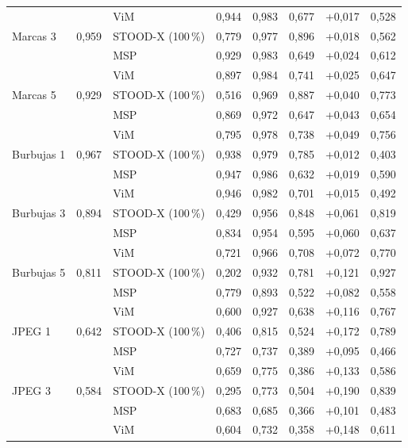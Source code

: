{\begin{longtable}{lllccccc}
 &  & ViM & 0{,}944 & 0{,}983 & 0{,}677 & +0{,}017 & 0{,}528 \\
\addlinespace[2pt]
Marcas 3 & 0{,}959 & STOOD-X (100\,\%) & 0{,}779 & 0{,}977 & 0{,}896 & +0{,}018 & 0{,}562 \\
 &  & MSP & 0{,}929 & 0{,}983 & 0{,}649 & +0{,}024 & 0{,}612 \\
 &  & ViM & 0{,}897 & 0{,}984 & 0{,}741 & +0{,}025 & 0{,}647 \\
\addlinespace[2pt]
Marcas 5 & 0{,}929 & STOOD-X (100\,\%) & 0{,}516 & 0{,}969 & 0{,}887 & +0{,}040 & 0{,}773 \\
 &  & MSP & 0{,}869 & 0{,}972 & 0{,}647 & +0{,}043 & 0{,}654 \\
 &  & ViM & 0{,}795 & 0{,}978 & 0{,}738 & +0{,}049 & 0{,}756 \\
\addlinespace[2pt]
Burbujas 1 & 0{,}967 & STOOD-X (100\,\%) & 0{,}938 & 0{,}979 & 0{,}785 & +0{,}012 & 0{,}403 \\
 &  & MSP & 0{,}947 & 0{,}986 & 0{,}632 & +0{,}019 & 0{,}590 \\
 &  & ViM & 0{,}946 & 0{,}982 & 0{,}701 & +0{,}015 & 0{,}492 \\
\addlinespace[2pt]
Burbujas 3 & 0{,}894 & STOOD-X (100\,\%) & 0{,}429 & 0{,}956 & 0{,}848 & +0{,}061 & 0{,}819 \\
 &  & MSP & 0{,}834 & 0{,}954 & 0{,}595 & +0{,}060 & 0{,}637 \\
 &  & ViM & 0{,}721 & 0{,}966 & 0{,}708 & +0{,}072 & 0{,}770 \\
\addlinespace[2pt]
Burbujas 5 & 0{,}811 & STOOD-X (100\,\%) & 0{,}202 & 0{,}932 & 0{,}781 & +0{,}121 & 0{,}927 \\
 &  & MSP & 0{,}779 & 0{,}893 & 0{,}522 & +0{,}082 & 0{,}558 \\
 &  & ViM & 0{,}600 & 0{,}927 & 0{,}638 & +0{,}116 & 0{,}767 \\
\addlinespace[2pt]
JPEG 1 & 0{,}642 & STOOD-X (100\,\%) & 0{,}406 & 0{,}815 & 0{,}524 & +0{,}172 & 0{,}789 \\
 &  & MSP & 0{,}727 & 0{,}737 & 0{,}389 & +0{,}095 & 0{,}466 \\
 &  & ViM & 0{,}659 & 0{,}775 & 0{,}386 & +0{,}133 & 0{,}586 \\
\addlinespace[2pt]
JPEG 3 & 0{,}584 & STOOD-X (100\,\%) & 0{,}295 & 0{,}773 & 0{,}504 & +0{,}190 & 0{,}839 \\
 &  & MSP & 0{,}683 & 0{,}685 & 0{,}366 & +0{,}101 & 0{,}483 \\
 &  & ViM & 0{,}604 & 0{,}732 & 0{,}358 & +0{,}148 & 0{,}611 \\

\end{longtable}}
